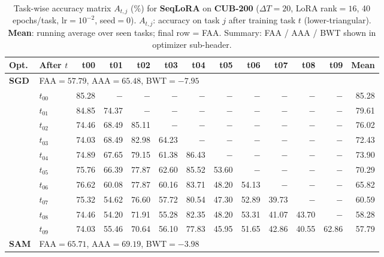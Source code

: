 
\begin{table}[ht]
\centering
\caption{%
  Task-wise accuracy matrix $A_{t,j}$ (\%) for \textbf{SeqLoRA} on \textbf{CUB-200}
  ($\Delta T=20$, LoRA rank$=16$, 40 epochs/task, lr$=10^{-2}$, seed$=0$).
  $A_{t,j}$: accuracy on task $j$ after training task $t$ (lower-triangular).
  \textbf{Mean}: running average over seen tasks; final row = FAA.
  Summary: FAA / AAA / BWT shown in optimizer sub-header.
}
\label{tab:raw_seqlora_cub200}
\setlength{\tabcolsep}{2.8pt}
\renewcommand{\arraystretch}{0.88}
\scriptsize
\begin{tabular}{@{}l l r r r r r r r r r r r@{}}
\toprule
\textbf{Opt.} & \textbf{After $t$} & \textbf{t00} & \textbf{t01} & \textbf{t02} & \textbf{t03} & \textbf{t04} & \textbf{t05} & \textbf{t06} & \textbf{t07} & \textbf{t08} & \textbf{t09} & \textbf{Mean} \\
\midrule
\multirow{11}{*}{\textbf{SGD}} & \multicolumn{12}{l}{\quad\small FAA$=57.79$,\; AAA$=65.48$,\; BWT$=-7.95$} \\
 & $t_{00}$ & 85.28 & $-$ & $-$ & $-$ & $-$ & $-$ & $-$ & $-$ & $-$ & $-$ & 85.28 \\
 & $t_{01}$ & 84.85 & 74.37 & $-$ & $-$ & $-$ & $-$ & $-$ & $-$ & $-$ & $-$ & 79.61 \\
 & $t_{02}$ & 74.46 & 68.49 & 85.11 & $-$ & $-$ & $-$ & $-$ & $-$ & $-$ & $-$ & 76.02 \\
 & $t_{03}$ & 74.03 & 68.49 & 82.98 & 64.23 & $-$ & $-$ & $-$ & $-$ & $-$ & $-$ & 72.43 \\
 & $t_{04}$ & 74.89 & 67.65 & 79.15 & 61.38 & 86.43 & $-$ & $-$ & $-$ & $-$ & $-$ & 73.90 \\
 & $t_{05}$ & 75.76 & 66.39 & 77.87 & 62.60 & 85.52 & 53.60 & $-$ & $-$ & $-$ & $-$ & 70.29 \\
 & $t_{06}$ & 76.62 & 60.08 & 77.87 & 60.16 & 83.71 & 48.20 & 54.13 & $-$ & $-$ & $-$ & 65.82 \\
 & $t_{07}$ & 75.32 & 54.62 & 76.60 & 57.72 & 80.54 & 47.30 & 52.89 & 39.73 & $-$ & $-$ & 60.59 \\
 & $t_{08}$ & 74.46 & 54.20 & 71.91 & 55.28 & 82.35 & 48.20 & 53.31 & 41.07 & 43.70 & $-$ & 58.28 \\
 & $t_{09}$ & 74.03 & 55.46 & 70.64 & 56.10 & 77.83 & 45.95 & 51.65 & 42.86 & 40.55 & 62.86 & 57.79 \\
\midrule
\multirow{11}{*}{\textbf{SAM}} & \multicolumn{12}{l}{\quad\small FAA$=65.71$,\; AAA$=69.19$,\; BWT$=-3.98$} \\

\end{tabular}
\end{table}
